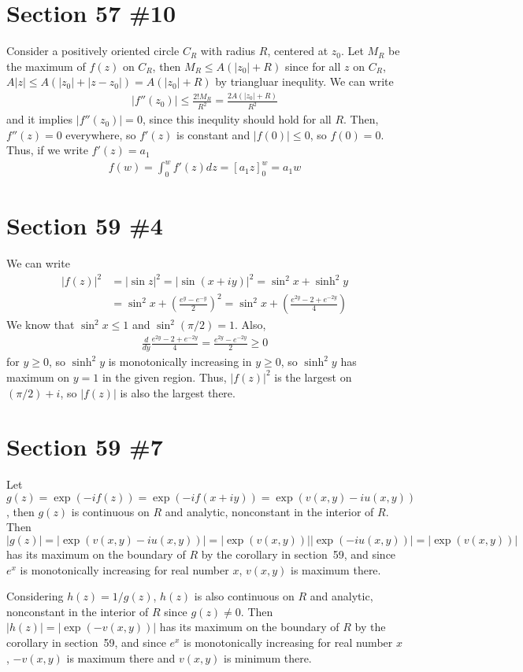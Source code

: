 \documentclass{scrartcl}
\begin{document}
\section{Section 57 \#10}
Consider a positively oriented circle \(C_R\) with radius \(R\), centered at \(z_0\).
Let \(M_R\) be the maximum of \(f(z)\) on \(C_R\), then \(M_R \leq A(|z_0| + R)\) since for all \(z\) on \(C_R\), \(A|z| \leq A(|z_0| + |z - z_0|) = A(|z_0| + R)\) by triangluar inequlity.
We can write
\begin{align*}
  |f''(z_0)| \leq \frac{2! M_R}{R^2} = \frac{2A(|z_0| + R)}{R^2}
\end{align*}
and it implies \(|f''(z_0)| = 0\), since this inequlity should hold for all \(R\).
Then, \(f''(z) = 0\) everywhere, so \(f'(z)\) is constant and \(|f(0)| \leq 0\), so \(f(0) = 0\).
Thus, if we write \(f'(z) = a_1\)
\begin{align*}
  f(w) = \int^w_0 f'(z) dz = \left[ a_1 z \right]^w_0 = a_1 w
\end{align*}

\section{Section 59 \#4}
We can write
\begin{align*}
  |f(z)|^2 &= |\sin z|^2 = |\sin (x + iy)|^2 = \sin^2 x + \sinh^2 y \\
           &= \sin^2 x + \left( \frac{e^y - e^{-y}}{2} \right)^2 = \sin^2 x + \left( \frac{e^{2y} - 2 + e^{-2y}}{4} \right)
\end{align*}
We know that \(\sin^2 x \leq 1\) and \(\sin^2 (\pi / 2) = 1\).
Also,
\begin{align*}
  \frac{d}{dy} \frac{e^{2y} - 2 + e^{-2y}}{4} = \frac{e^{2y} - e^{-2y}}{2} \geq 0
\end{align*}
for \(y \geq 0\), so \(\sinh^2 y\) is monotonically increasing in \(y \geq 0\), so \(\sinh^2 y\) has maximum on \(y = 1\) in the given region.
Thus, \(|f(z)|^2\) is the largest on \((\pi / 2) + i\), so \(|f(z)|\) is also the largest there.

\section{Section 59 \#7}
Let \(g(z) = \exp(-if(z)) = \exp(-if(x + iy)) = \exp(v(x, y) - iu(x, y))\), then \(g(z)\) is continuous on \(R\) and analytic, nonconstant in the interior of \(R\).
Then \(|g(z)| = |\exp(v(x, y) - iu(x, y))| = |\exp(v(x, y))| |\exp(-iu(x, y))| = |\exp(v(x, y))|\) has its maximum on the boundary of \(R\) by the corollary in section~59, and since \(e^x\) is monotonically increasing for real number \(x\), \(v(x, y)\) is maximum there.

Considering \(h(z) = 1 / g(z)\), \(h(z)\) is also continuous on \(R\) and analytic, nonconstant in the interior of \(R\) since \(g(z) \not = 0\).
Then \(|h(z)| = |\exp(-v(x, y))|\) has its maximum on the boundary of \(R\) by the corollary in section~59, and since \(e^x\) is monotonically increasing for real number \(x\), \(-v(x, y)\) is maximum there and \(v(x, y)\) is minimum there.
\end{document}
